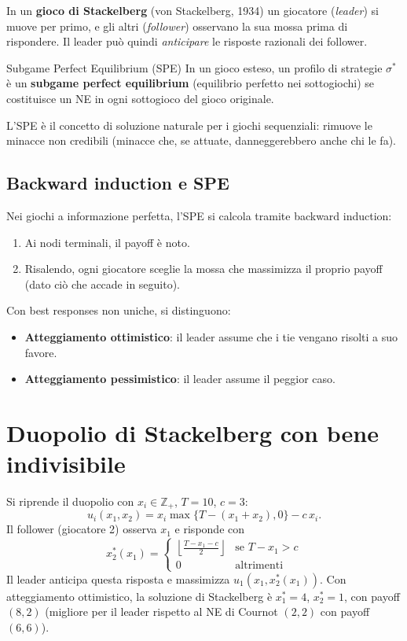 \documentclass[12pt,a4paper,twoside]{book}
\theoremstyle{plain}
\theoremstyle{definition}
\begin{document}
In un \textbf{gioco di Stackelberg} (von Stackelberg, 1934) un giocatore (\emph{leader}) si muove per primo, e gli altri (\emph{follower}) osservano la sua mossa prima di rispondere. Il leader può quindi \emph{anticipare} le risposte razionali dei follower.

\begin{defbox}{Subgame Perfect Equilibrium (SPE)}
In un gioco esteso, un profilo di strategie $\sigma^*$ è un \textbf{subgame perfect equilibrium} (equilibrio perfetto nei sottogiochi) se costituisce un NE in ogni sottogioco del gioco originale.
\end{defbox}

L'SPE è il concetto di soluzione naturale per i giochi sequenziali: rimuove le minacce non credibili (minacce che, se attuate, danneggerebbero anche chi le fa).

\subsection{Backward induction e SPE}

Nei giochi a informazione perfetta, l'SPE si calcola tramite backward induction:
\begin{enumerate}
  \item Ai nodi terminali, il payoff è noto.
  \item Risalendo, ogni giocatore sceglie la mossa che massimizza il proprio payoff (dato ciò che accade in seguito).
\end{enumerate}
Con best responses non uniche, si distinguono:
\begin{itemize}
  \item \textbf{Atteggiamento ottimistico}: il leader assume che i tie vengano risolti a suo favore.
  \item \textbf{Atteggiamento pessimistico}: il leader assume il peggior caso.
\end{itemize}

\section{Duopolio di Stackelberg con bene indivisibile}

Si riprende il duopolio con $x_i\in\mathbb{Z}_+$, $T=10$, $c=3$:
\[
  u_i(x_1,x_2) = x_i\max\{T-(x_1+x_2),0\} - c\,x_i.
\]
Il follower (giocatore 2) osserva $x_1$ e risponde con
\[
  x_2^*(x_1) = \begin{cases}
    \displaystyle\left\lfloor\frac{T-x_1-c}{2}\right\rfloor & \text{se }T-x_1>c \\
    0 & \text{altrimenti}
  \end{cases}
\]
Il leader anticipa questa risposta e massimizza $u_1(x_1, x_2^*(x_1))$. Con atteggiamento ottimistico, la soluzione di Stackelberg è $x_1^*=4$, $x_2^*=1$, con payoff $(8,2)$ (migliore per il leader rispetto al NE di Cournot $(2,2)$ con payoff $(6,6)$).
\end{document}
